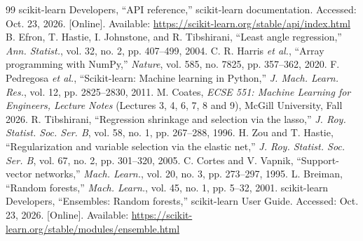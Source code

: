 \documentclass[conference]{IEEEtran}
\begin{document}
\FloatBarrier
\begin{thebibliography}{99}
 scikit-learn Developers, ``API reference,'' scikit-learn documentation. Accessed: Oct. 23, 2026. [Online]. Available: \url{https://scikit-learn.org/stable/api/index.html}
 B. Efron, T. Hastie, I. Johnstone, and R. Tibshirani, ``Least angle regression,'' \emph{Ann. Statist.}, vol. 32, no. 2, pp. 407--499, 2004.
 C. R. Harris \emph{et al.}, ``Array programming with NumPy,'' \emph{Nature}, vol. 585, no. 7825, pp. 357--362, 2020.
 F. Pedregosa \emph{et al.}, ``Scikit-learn: Machine learning in Python,'' \emph{J. Mach. Learn. Res.}, vol. 12, pp. 2825--2830, 2011.
 M. Coates, \emph{ECSE 551: Machine Learning for Engineers, Lecture Notes} (Lectures 3, 4, 6, 7, 8 and 9), McGill University, Fall 2026.
 R. Tibshirani, ``Regression shrinkage and selection via the lasso,'' \emph{J. Roy. Statist. Soc. Ser. B}, vol. 58, no. 1, pp. 267--288, 1996.
 H. Zou and T. Hastie, ``Regularization and variable selection via the elastic net,'' \emph{J. Roy. Statist. Soc. Ser. B}, vol. 67, no. 2, pp. 301--320, 2005.
 C. Cortes and V. Vapnik, ``Support-vector networks,'' \emph{Mach. Learn.}, vol. 20, no. 3, pp. 273--297, 1995.
 L. Breiman, ``Random forests,'' \emph{Mach. Learn.}, vol. 45, no. 1, pp. 5--32, 2001.
 scikit-learn Developers, ``Ensembles: Random forests,'' scikit-learn User Guide. Accessed: Oct. 23, 2026. [Online]. Available: \url{https://scikit-learn.org/stable/modules/ensemble.html}
\end{thebibliography}
\end{document}
